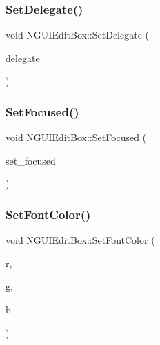 \hypertarget{class_n_g_u_i_edit_box_a11b4db699a702895c28afaf875b62ae9}{}\label{class_n_g_u_i_edit_box_a11b4db699a702895c28afaf875b62ae9} 
\subsubsection{\texorpdfstring{Set\+Delegate()}{SetDelegate()}}
{\footnotesize\ttfamily void N\+G\+U\+I\+Edit\+Box\+::\+Set\+Delegate (\begin{DoxyParamCaption}\item[{N\+G\+U\+I\+Edit\+Box\+Delegate@}]{delegate }\end{DoxyParamCaption})}

\hypertarget{class_n_g_u_i_edit_box_a7ade6e73cfe87db765fe37dbda64f913}{}\label{class_n_g_u_i_edit_box_a7ade6e73cfe87db765fe37dbda64f913} 
\subsubsection{\texorpdfstring{Set\+Focused()}{SetFocused()}}
{\footnotesize\ttfamily void N\+G\+U\+I\+Edit\+Box\+::\+Set\+Focused (\begin{DoxyParamCaption}\item[{bool}]{set\+\_\+focused }\end{DoxyParamCaption})}

\hypertarget{class_n_g_u_i_edit_box_ad2050664dcd6afc32149ccabfd4ef994}{}\label{class_n_g_u_i_edit_box_ad2050664dcd6afc32149ccabfd4ef994} 
\subsubsection{\texorpdfstring{Set\+Font\+Color()}{SetFontColor()}}
{\footnotesize\ttfamily void N\+G\+U\+I\+Edit\+Box\+::\+Set\+Font\+Color (\begin{DoxyParamCaption}\item[{float}]{r,  }\item[{float}]{g,  }\item[{float}]{b }\end{DoxyParamCaption})}

